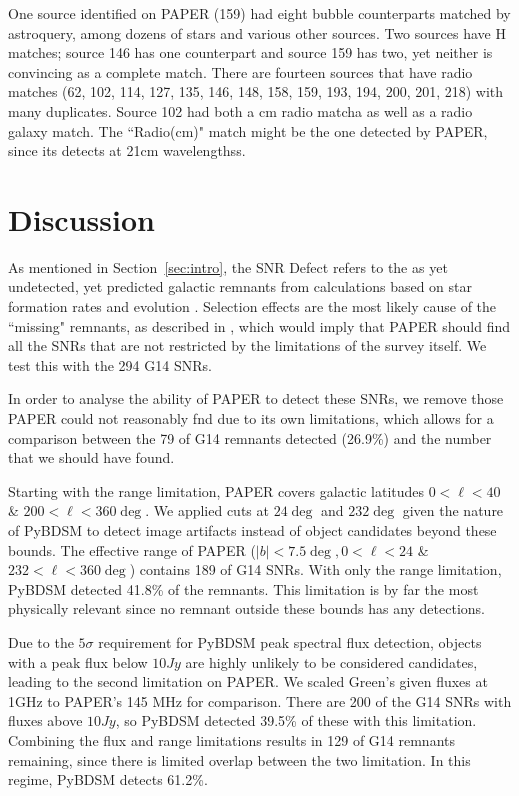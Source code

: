 \documentclass[useAMS,usenatbib]{mn2e}
\begin{document}
One source identified on PAPER (159) had eight bubble counterparts matched by astroquery, among dozens of stars and various other sources.  Two  sources have {H} matches; source 146 has one counterpart and source 159 has two, yet neither is convincing as a complete match.  There are fourteen sources that have radio matches (62, 102, 114, 127, 135, 146, 148, 158, 159, 193, 194, 200, 201, 218) with many duplicates.  Source 102 had both a cm radio matcha as well as a radio galaxy match.  The ``Radio(cm)" match might be the one detected by PAPER, since its detects at 21cm wavelengthss.  

\section{Discussion}
\label{sec:disc}


As mentioned in Section~\ref{sec:intro}, the SNR Defect refers to the as yet undetected, yet predicted galactic remnants from calculations based on star formation rates and evolution \citep{Li.91,Pavlovic.13}.  Selection effects are the most likely cause of the ``missing" remnants, as described in \cite{Brogan.06}, which would imply that PAPER should find all the SNRs that are not restricted by the limitations of the survey itself.  We test this with the 294 G14 SNRs.  

In order to analyse the ability of PAPER to detect these SNRs, we remove those PAPER could not reasonably fnd due to its own limitations, which allows for a comparison between the 79 of G14 remnants detected (26.9\%) and the number that we should have found.  

Starting with the range limitation, PAPER covers galactic latitudes $0 < \ell < 40$ \& $200 < \ell < 360 \deg$.  We applied cuts at $24 \deg$ and $232 \deg$ given the nature of PyBDSM to detect image artifacts instead of object candidates beyond these bounds.  The effective range of PAPER ($|b| < 7.5 \deg, 0 < \ell < 24$ \& $232 < \ell < 360 \deg$) contains 189 of G14 SNRs.  With only the range limitation, PyBDSM detected 41.8\% of the remnants.  This limitation is by far the most physically relevant since no remnant outside these bounds has any detections. 

Due to the $5\sigma$ requirement for PyBDSM peak spectral flux detection, objects with a peak flux below $10 Jy$ are highly unlikely to be considered candidates, leading to the second limitation on PAPER.  We scaled Green’s given fluxes at 1GHz to PAPER’s 145 MHz for comparison.  There are 200 of the G14 SNRs with fluxes above $10 Jy$, so PyBDSM detected 39.5\% of these with this limitation.  Combining the flux and range limitations results in 129 of G14 remnants remaining, since there is limited overlap between the two limitation.  In this regime, PyBDSM detects 61.2\%.  
\end{document}
